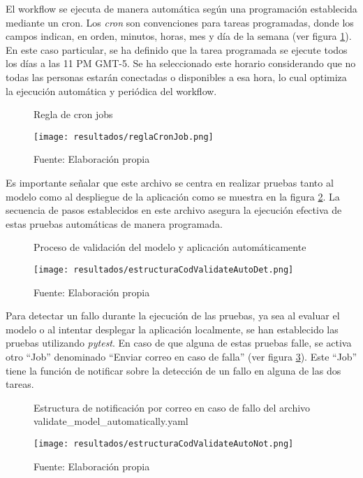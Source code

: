 El workflow se ejecuta de manera automática según una programación establecida mediante un cron. Los \textit{cron} son convenciones para tareas programadas, donde los campos indican, en orden, minutos, horas, mes y día de la semana (ver figura \ref{fig:figuraReglaCronJob}). En este caso particular, se ha definido que la tarea programada se ejecute todos los días a las 11 PM GMT-5. Se ha seleccionado este horario considerando que no todas las personas estarán conectadas o disponibles a esa hora, lo cual optimiza la ejecución automática y periódica del workflow.

\begin{figure}[h]
	\centering
	\caption{Regla de cron jobs}
	\texttt{[image: resultados/reglaCronJob.png]}
	\caption*{\footnotesize Fuente: Elaboración propia}
	\label{fig:figuraReglaCronJob}
\end{figure}

Es importante señalar que este archivo se centra en realizar pruebas tanto al modelo como al despliegue de la aplicación como se muestra en la figura \ref{fig:figuraEstructuraCodValidateAutoDet}. La secuencia de pasos establecidos en este archivo asegura la ejecución efectiva de estas pruebas automáticas de manera programada.

\newpage

\begin{figure}[h]
	\centering
	\caption{Proceso de validación del modelo y aplicación automáticamente}
	\texttt{[image: resultados/estructuraCodValidateAutoDet.png]}
	\caption*{\footnotesize Fuente: Elaboración propia}
	\label{fig:figuraEstructuraCodValidateAutoDet}
\end{figure}

Para detectar un fallo durante la ejecución de las pruebas, ya sea al evaluar el modelo o al intentar desplegar la aplicación localmente, se han establecido las pruebas utilizando \textit{pytest}. En caso de que alguna de estas pruebas falle, se activa otro ``Job'' denominado ``Enviar correo en caso de falla'' (ver figura \ref{fig:figuraEstructuraCodValidateAutoNot}). Este ``Job'' tiene la función de notificar sobre la detección de un fallo en alguna de las dos tareas.

\begin{figure}[h]
	\centering
	\caption{Estructura de notificación por correo en caso de fallo del archivo validate\_model\_automatically.yaml}
	\texttt{[image: resultados/estructuraCodValidateAutoNot.png]}
	\caption*{\footnotesize Fuente: Elaboración propia}
	\label{fig:figuraEstructuraCodValidateAutoNot}
\end{figure}

